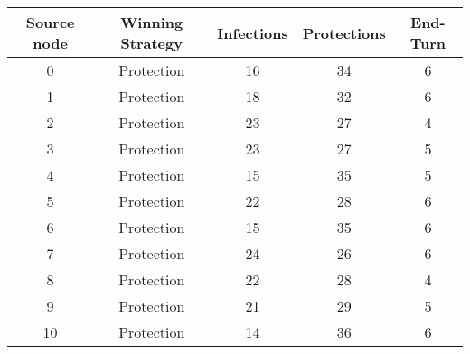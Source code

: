 \documentclass[results.tex]{subfiles}
\begin{document}
    \begin{center}
        \begin{tabular}{| c || c | c | c | c |}
            \hline
            {\bfseries Source node} & {\bfseries Winning Strategy} & {\bfseries Infections} & {\bfseries Protections}
            & {\bfseries End-Turn}
            \\  %
            \hline\hline
            0                       & Protection                   & 16                     & 34                      & 6                    \\
            \hline
            1                       & Protection                   & 18                     & 32                      & 6                    \\
            \hline
            2                       & Protection                   & 23                     & 27                      & 4                    \\
            \hline
            3                       & Protection                   & 23                     & 27                      & 5                    \\
            \hline
            4                       & Protection                   & 15                     & 35                      & 5                    \\
            \hline
            5                       & Protection                   & 22                     & 28                      & 6                    \\
            \hline
            6                       & Protection                   & 15                     & 35                      & 6                    \\
            \hline
            7                       & Protection                   & 24                     & 26                      & 6                    \\
            \hline
            8                       & Protection                   & 22                     & 28                      & 4                    \\
            \hline
            9                       & Protection                   & 21                     & 29                      & 5                    \\
            \hline
            10                      & Protection                   & 14                     & 36                      & 6                    \\

\end{tabular}
\end{center}
\end{document}

